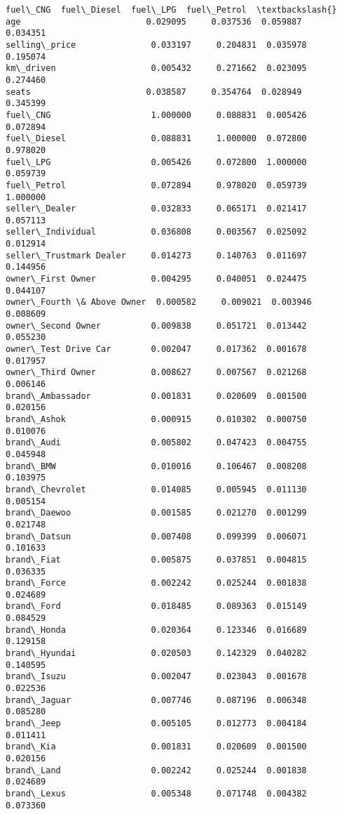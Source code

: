 \documentclass[11pt]{article}
\begin{document}
\begin{tcolorbox}[breakable, size=fbox, boxrule=.5pt, pad at break*=1mm, opacityfill=0]
\begin{Verbatim}[commandchars=\\\{\}]
                            fuel\_CNG  fuel\_Diesel  fuel\_LPG  fuel\_Petrol  \textbackslash{}
age                         0.029095     0.037536  0.059887     0.034351
selling\_price               0.033197     0.204831  0.035978     0.195074
km\_driven                   0.005432     0.271662  0.023095     0.274460
seats                       0.038587     0.354764  0.028949     0.345399
fuel\_CNG                    1.000000     0.088831  0.005426     0.072894
fuel\_Diesel                 0.088831     1.000000  0.072800     0.978020
fuel\_LPG                    0.005426     0.072800  1.000000     0.059739
fuel\_Petrol                 0.072894     0.978020  0.059739     1.000000
seller\_Dealer               0.032833     0.065171  0.021417     0.057113
seller\_Individual           0.036808     0.003567  0.025092     0.012914
seller\_Trustmark Dealer     0.014273     0.140763  0.011697     0.144956
owner\_First Owner           0.004295     0.040051  0.024475     0.044107
owner\_Fourth \& Above Owner  0.000582     0.009021  0.003946     0.008609
owner\_Second Owner          0.009838     0.051721  0.013442     0.055230
owner\_Test Drive Car        0.002047     0.017362  0.001678     0.017957
owner\_Third Owner           0.008627     0.007567  0.021268     0.006146
brand\_Ambassador            0.001831     0.020609  0.001500     0.020156
brand\_Ashok                 0.000915     0.010302  0.000750     0.010076
brand\_Audi                  0.005802     0.047423  0.004755     0.045948
brand\_BMW                   0.010016     0.106467  0.008208     0.103975
brand\_Chevrolet             0.014085     0.005945  0.011130     0.005154
brand\_Daewoo                0.001585     0.021270  0.001299     0.021748
brand\_Datsun                0.007408     0.099399  0.006071     0.101633
brand\_Fiat                  0.005875     0.037851  0.004815     0.036335
brand\_Force                 0.002242     0.025244  0.001838     0.024689
brand\_Ford                  0.018485     0.089363  0.015149     0.084529
brand\_Honda                 0.020364     0.123346  0.016689     0.129158
brand\_Hyundai               0.020503     0.142329  0.040282     0.140595
brand\_Isuzu                 0.002047     0.023043  0.001678     0.022536
brand\_Jaguar                0.007746     0.087196  0.006348     0.085280
brand\_Jeep                  0.005105     0.012773  0.004184     0.011411
brand\_Kia                   0.001831     0.020609  0.001500     0.020156
brand\_Land                  0.002242     0.025244  0.001838     0.024689
brand\_Lexus                 0.005348     0.071748  0.004382     0.073360

\end{Verbatim}
\end{tcolorbox}
\end{document}
